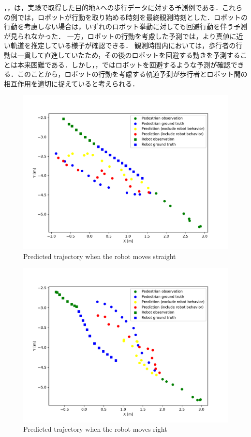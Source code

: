 ，，は，実験で取得した目的地Aへの歩行データに対する予測例である．これらの例では，ロボットが行動を取り始める時刻を最終観測時刻とした．ロボットの行動を考慮しない場合は，いずれのロボット挙動に対しても回避行動を伴う予測が見られなかった．
一方，ロボットの行動を考慮した予測では，より真値に近い軌道を推定している様子が確認できる．
観測時間内においては，歩行者の行動は一貫して直進していたため，その後のロボットを回避する動きを予測することは本来困難である．しかし，，ではロボットを回避するような予測が確認できる．このことから，ロボットの行動を考慮する軌道予測が歩行者とロボット間の相互作用を適切に捉えていると考えられる．

\vspace{-10pt}

\begin{figure}[H]
  \centering
 \includegraphics[keepaspectratio, scale=0.58]
      {images/pred_straight.pdf}
\caption{Predicted trajectory when the robot moves straight}
 \label{Fig:pred-straight}
\end{figure}

\begin{figure}[H]
  \centering
 \includegraphics[keepaspectratio, scale=0.58]
      {images/pred_right.pdf}
\caption{Predicted trajectory when the robot moves right}
 \label{Fig:pred-right}
\end{figure}

